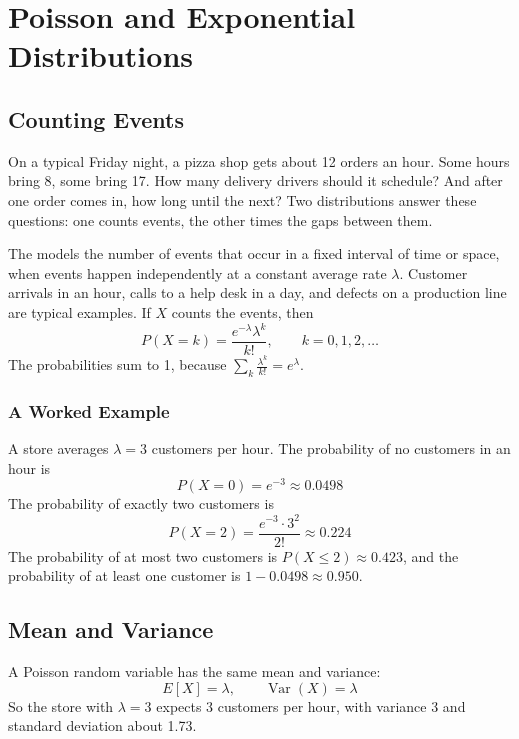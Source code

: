 \chapter{Poisson and Exponential Distributions}

\section{Counting Events}
On a typical Friday night, a pizza shop gets about 12 orders an hour. Some
hours bring 8, some bring 17. How many delivery drivers should it
schedule? And after one order comes in, how long until the next? Two
distributions answer these questions: one counts events, the other times
the gaps between them.

The  models the number of events that occur in a fixed interval of time or space,
when events happen independently at a constant average rate $\lambda$. Customer arrivals in an hour, calls to a
help desk in a day, and defects on a production line are typical examples. If $X$ counts the events, then
$$P(X = k) = \frac{e^{-\lambda}\lambda^k}{k!}, \qquad k = 0, 1, 2, \ldots$$
The probabilities sum to 1, because $\sum_k \frac{\lambda^k}{k!} = e^{\lambda}$.

\subsection{A Worked Example}
A store averages $\lambda = 3$ customers per hour. The probability of no customers in an hour is
$$P(X = 0) = e^{-3} \approx 0.0498$$
The probability of exactly two customers is
$$P(X = 2) = \frac{e^{-3} \cdot 3^2}{2!} \approx 0.224$$
The probability of at most two customers is $P(X \le 2) \approx 0.423$, and the probability of at least one customer is
$1 - 0.0498 \approx 0.950$.

\section{Mean and Variance}
A Poisson random variable has the same mean and variance:
$$E[X] = \lambda, \qquad \operatorname{Var}(X) = \lambda$$
So the store with $\lambda = 3$ expects 3 customers per hour, with variance 3 and standard deviation about 1.73.

